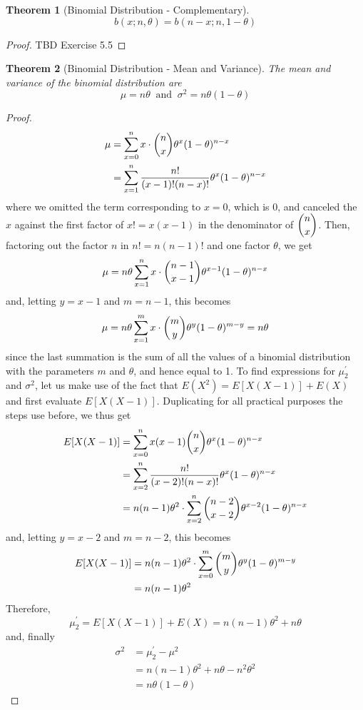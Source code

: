 \documentclass[
10pt,reqno
]{amsart}
\newtheorem{theorem}{Theorem}[section]
\theoremstyle{definition}
\begin{document}
\begin{theorem}[Binomial Distribution - Complementary]
\[
b(x; n, \theta)=b(n-x; n, 1 - \theta)
\]
\end{theorem}

\begin{proof}
TBD Exercise 5.5
\end{proof}

\newpage

\begin{theorem}[Binomial Distribution - Mean and Variance]
The mean and variance of the binomial distribution are
\[
\mu = n\theta \;\; \text{and} \;\; \sigma^2 = n \theta(1-\theta)
\]
\end{theorem}

\begin{proof}
\begin{align*}
\mu &= \sum_{x=0}^n x \cdot \dbinom n x \theta^x (1-\theta)^{n-x}\\
&= \sum_{x=1}^n \frac{n!}{(x-1)!(n-x)!}\theta^x(1-\theta)^{n-x}
\end{align*}
where we omitted the term corresponding to \(x=0\), which is 0, and canceled the \(x\) against the first factor of \(x!=x(x-1)\) in the denominator of \(\dbinom n x\). Then, factoring out the factor \(n\) in \(n! = n(n-1)!\) and one factor \(\theta\), we get
\[
\mu = n \theta \sum_{x=1}^n x \cdot \dbinom {n-1} {x-1} \theta^{x-1} (1-\theta)^{n-x}\\
\]
and, letting \(y=x-1\) and \(m = n-1\), this becomes
\[
\mu = n \theta \sum_{x=1}^m x \cdot \dbinom {m} {y} \theta^{y}(1-\theta)^{m-y}=n \theta
\]
since the last summation is the sum of all the values of a binomial distribution with the parameters \(m\) and \(\theta\), and hence equal to 1.
To find expressions for \(\mu_2^{'}\) and \(\sigma^2\), let us make use of the fact that \(E(X^2) = E[X(X-1)]+E(X)\) and first evaluate \(E[X(X-1)]\). Duplicating for all practical purposes the steps use before, we thus get
\begin{align*}
E[X(X-1)] &= \sum_{x=0}^n x (x-1) \dbinom n x \theta^x (1-\theta)^{n-x}\\
&= \sum_{x=2}^n \frac {n!} {(x-2)!(n-x)!} \theta^{x} (1-\theta)^{n-x}\\
&=n(n-1)\theta^2 \cdot \sum_{x=2}^n \dbinom {n-2}{x-2}\theta^{x-2} (1-\theta)^{n-x}
\end{align*}
and, letting \(y=x-2\) and \(m=n-2\), this becomes
\begin{align*}
E[X(X-1)] &= n(n-1)\theta^2 \cdot \sum_{x=0}^m \dbinom m y \theta^y (1-\theta)^{m-y}\\
&= n(n-1)\theta^2
\end{align*}
Therefore,
\[
\mu_2^{'} = E[X(X-1)] + E(X) = n(n-1) \theta^2 + n \theta
\]
and, finally
\begin{align*}
\sigma^2 &= \mu_2^{'} - \mu^2\\
&=n(n-1)\theta^2 + n\theta - n^2\theta^2 \\
&=n\theta(1-\theta)
\end{align*}
\end{proof}
\end{document}
